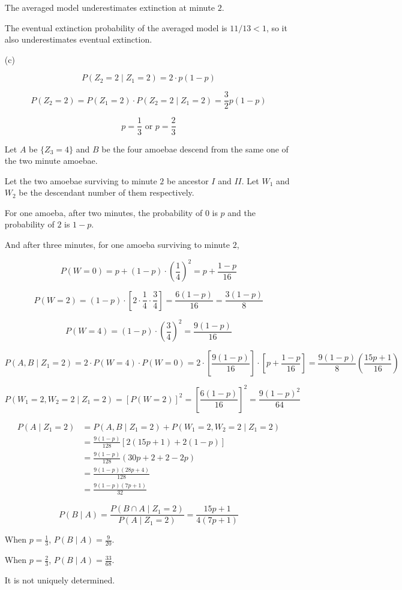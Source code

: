 \documentclass[11pt,a4paper]{article}
\begin{document}
\begin{enumerate}
    The averaged model underestimates extinction at minute $2$.

    The eventual extinction probability of the averaged model is $11/13 < 1$, so it also underestimates eventual extinction.

    \item[(c)]
    
    $$
    P(Z_2 = 2 \mid Z_1 = 2) = 2 \cdot p(1-p)
    $$

    $$
    P(Z_2 = 2) = P(Z_1 = 2) \cdot P(Z_2 = 2 \mid Z_1 = 2) =  \frac{3}{2} p(1-p)
    $$

    $$
    p = \frac{1}{3} \text{ or } p = \frac{2}{3}
    $$

    Let $A$ be $\{Z_3 = 4\}$ and $B$ be the four amoebae descend from the same one of the two minute amoebae.

    Let the two amoebae surviving to minute $2$ be ancestor $I$ and $II$. Let $W_1$ and $W_2$ be the descendant number of them respectively.

    For one amoeba, after two minutes, the probability of $0$ is $p$ and the probability of $2$ is $1-p$.

    And after three minutes, for one amoeba surviving to minute $2$,

    $$
    P(W = 0) = p + (1-p) \cdot \left(\frac{1}{4}\right)^2 = p + \frac{1-p}{16}
    $$

    $$
    P(W = 2) = (1-p) \cdot \left[2 \cdot \frac{1}{4} \cdot \frac{3}{4}\right] = \frac{6(1-p)}{16} = \frac{3(1-p)}{8}
    $$

    $$
    P(W = 4) = (1-p) \cdot \left(\frac{3}{4}\right)^2 = \frac{9(1-p)}{16}
    $$

    $$
    P(A, B \mid Z_1 = 2)
    = 2 \cdot P(W = 4) \cdot P(W = 0)
    = 2 \cdot \left[\frac{9(1-p)}{16}\right] \cdot \left[p + \frac{1-p}{16}\right]
    = \frac{9(1-p)}{8} \left(\frac{15p + 1}{16}\right)
    $$

    $$
    P(W_1 = 2, W_2 = 2 \mid Z_1 = 2)
    = [P(W = 2)]^2 = \left[\frac{6(1-p)}{16}\right]^2
    = \frac{9(1-p)^2}{64}
    $$

    $$
    \begin{aligned}
    P(A \mid Z_1 = 2)
    &= P(A, B \mid Z_1 = 2) + P(W_1 = 2, W_2 = 2 \mid Z_1 = 2) \\
    &= \frac{9(1-p)}{128} \left[2(15p + 1) + 2(1-p)\right] \\
    &= \frac{9(1-p)}{128} (30p + 2 + 2 - 2p) \\
    &= \frac{9(1-p)(28p + 4)}{128} \\
    &= \frac{9(1-p)(7p + 1)}{32}
    \end{aligned}
    $$

    $$
    P(B \mid A)
    = \frac{P(B \cap A \mid Z_1 = 2)}{P(A \mid Z_1 = 2)}
    = \frac{15p + 1}{4(7p + 1)}
    $$

    When $p=\frac{1}{3}$, $P(B \mid A) = \frac{9}{20}$.

    When $p=\frac{2}{3}$, $P(B \mid A) = \frac{33}{68}$.

    It is not uniquely determined.
\end{enumerate}
\end{document}
